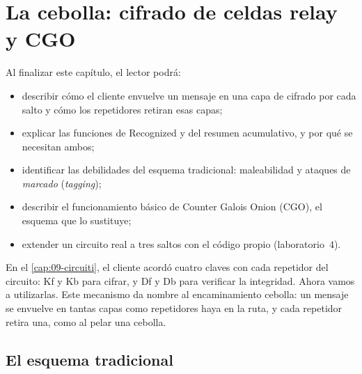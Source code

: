 \chapter{La cebolla: cifrado de celdas relay y CGO}\label{cap:10-cifratura-relay}

\begin{obiettivi}
Al finalizar este capítulo, el lector podrá:
\begin{itemize}[nosep]
  \item describir cómo el cliente envuelve un mensaje en una capa de cifrado por cada salto y cómo los repetidores retiran esas capas;
  \item explicar las funciones de Recognized y del resumen acumulativo, y por qué se necesitan ambos;
  \item identificar las debilidades del esquema tradicional: maleabilidad y ataques de \emph{marcado} (\emph{tagging});
  \item describir el funcionamiento básico de Counter Galois Onion (CGO), el esquema que lo sustituye;
  \item extender un circuito real a tres saltos con el código propio (laboratorio~4).
\end{itemize}
\end{obiettivi}

En el \cref{cap:09-circuiti}, el cliente acordó cuatro claves con cada repetidor del circuito: Kf y Kb para cifrar, y Df y Db para verificar la integridad. Ahora vamos a utilizarlas. Este mecanismo da nombre al encaminamiento cebolla: un mensaje se envuelve en tantas capas como repetidores haya en la ruta, y cada repetidor retira una, como al pelar una cebolla.

\section{El esquema tradicional}\label{sec:tor1}

